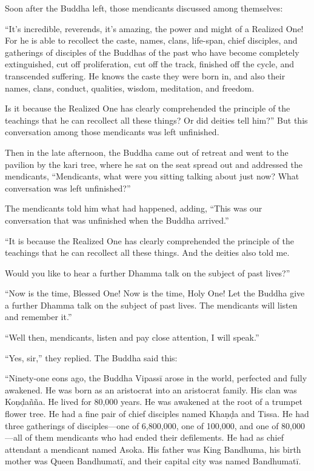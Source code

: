 \documentclass[12pt,openany]{book}%
\begin{document}
Soon after the Buddha left, those mendicants discussed among themselves: 

“It’s incredible, reverends, it’s amazing, the power and might of a Realized One! For he is able to recollect the caste, names, clans, life-span, chief disciples, and gatherings of disciples of the Buddhas of the past who have become completely extinguished, cut off proliferation, cut off the track, finished off the cycle, and transcended suffering. He knows the caste they were born in, and also their names, clans, conduct, qualities, wisdom, meditation, and freedom. 

Is it because the Realized One has clearly comprehended the principle of the teachings that he can recollect all these things? Or did deities tell him?” But this conversation among those mendicants was left unfinished. 

Then in the late afternoon, the Buddha came out of retreat and went to the pavilion by the kari tree, where he sat on the seat spread out and addressed the mendicants, “Mendicants, what were you sitting talking about just now? What conversation was left unfinished?” 

The mendicants told him what had happened, adding, “This was our conversation that was unfinished when the Buddha arrived.” 

“It is because the Realized One has clearly comprehended the principle of the teachings that he can recollect all these things. And the deities also told me. 

Would you like to hear a further Dhamma talk on the subject of past lives?” 

“Now is the time, Blessed One! Now is the time, Holy One! Let the Buddha give a further Dhamma talk on the subject of past lives. The mendicants will listen and remember it.” 

“Well then, mendicants, listen and pay close attention, I will speak.” 

“Yes, sir,” they replied. The Buddha said this: 

“Ninety-one eons ago, the Buddha \textsanskrit{Vipassī} arose in the world, perfected and fully awakened. He was born as an aristocrat into an aristocrat family. His clan was \textsanskrit{Koṇḍañña}. He lived for 80,000 years. He was awakened at the root of a trumpet flower tree. He had a fine pair of chief disciples named \textsanskrit{Khaṇḍa} and Tissa. He had three gatherings of disciples—one of 6,800,000, one of 100,000, and one of 80,000—all of them mendicants who had ended their defilements. He had as chief attendant a mendicant named Asoka. His father was King Bandhuma, his birth mother was Queen \textsanskrit{Bandhumatī}, and their capital city was named \textsanskrit{Bandhumatī}. 
\end{document}
